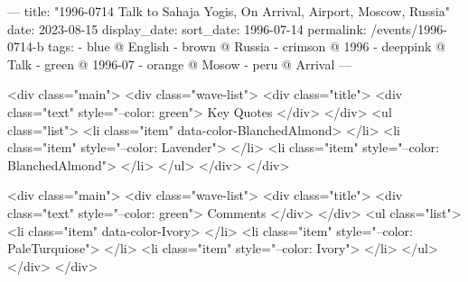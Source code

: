 ---
title: "1996-0714 Talk to Sahaja Yogis, On Arrival, Airport, Moscow, Russia"
date: 2023-08-15
display_date: 
sort_date: 1996-07-14
permalink: /events/1996-0714-b
tags:
  - blue @ English
  - brown @ Russia
  - crimson @ 1996
  - deeppink @ Talk
  - green @ 1996-07
  - orange @ Mosow
  - peru @ Arrival
---

<div class="main">
  <div class="wave-list">
    <div class="title">
      <div class="text" style="--color: green">
        Key Quotes
      </div>
    </div>
    <ul class="list">
        <li class="item" data-color-BlanchedAlmond>
        </li>
        <li class="item" style="--color: Lavender">
        </li>
        <li class="item" style="--color: BlanchedAlmond">
        </li>
      </ul>
  </div>
</div>

<div class="main">
  <div class="wave-list">
    <div class="title">
      <div class="text" style="--color: green">
        Comments
      </div>
    </div>
    <ul class="list">
        <li class="item" data-color-Ivory>
        </li>
        <li class="item" style="--color: PaleTurquiose">
        </li>
        <li class="item" style="--color: Ivory">
        </li>
      </ul>
  </div>
</div>